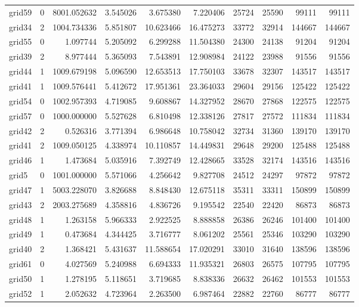 \begin{longtable}{|l|r|r|r|r|r|r|r|r|r|}
grid59 & 0 & 8001.052632 & 3.545026 & 3.675380 & 7.220406 & 25724 & 25590 & 99111 & 99111 \\
grid34 & 2 & 1004.734336 & 5.851807 & 10.623466 & 16.475273 & 33772 & 32914 & 144667 & 144667 \\
grid55 & 0 & 1.097744 & 5.205092 & 6.299288 & 11.504380 & 24300 & 24138 & 91204 & 91204 \\
grid39 & 2 & 8.977444 & 5.365093 & 7.543891 & 12.908984 & 24122 & 23988 & 91556 & 91556 \\
grid44 & 1 & 1009.679198 & 5.096590 & 12.653513 & 17.750103 & 33678 & 32307 & 143517 & 143517 \\
grid41 & 1 & 1009.576441 & 5.412672 & 17.951361 & 23.364033 & 29604 & 29156 & 125422 & 125422 \\
grid54 & 0 & 1002.957393 & 4.719085 & 9.608867 & 14.327952 & 28670 & 27868 & 122575 & 122575 \\
grid57 & 0 & 1000.000000 & 5.527628 & 6.810498 & 12.338126 & 27817 & 27572 & 111834 & 111834 \\
grid42 & 2 & 0.526316 & 3.771394 & 6.986648 & 10.758042 & 32734 & 31360 & 139170 & 139170 \\
grid41 & 2 & 1009.050125 & 4.338974 & 10.110857 & 14.449831 & 29648 & 29200 & 125488 & 125488 \\
grid46 & 1 & 1.473684 & 5.035916 & 7.392749 & 12.428665 & 33528 & 32174 & 143516 & 143516 \\
grid5 & 0 & 1001.000000 & 5.571066 & 4.256642 & 9.827708 & 24512 & 24297 & 97872 & 97872 \\
grid47 & 1 & 5003.228070 & 3.826688 & 8.848430 & 12.675118 & 35311 & 33311 & 150899 & 150899 \\
grid43 & 2 & 2003.275689 & 4.358816 & 4.836726 & 9.195542 & 22540 & 22420 & 86873 & 86873 \\
grid48 & 1 & 1.263158 & 5.966333 & 2.922525 & 8.888858 & 26386 & 26246 & 101400 & 101400 \\
grid49 & 1 & 0.473684 & 4.344425 & 3.716777 & 8.061202 & 25561 & 25346 & 103290 & 103290 \\
grid40 & 2 & 1.368421 & 5.431637 & 11.588654 & 17.020291 & 33010 & 31640 & 138596 & 138596 \\
grid61 & 0 & 4.027569 & 5.240988 & 6.694333 & 11.935321 & 26803 & 26575 & 107795 & 107795 \\
grid50 & 1 & 1.278195 & 5.118651 & 3.719685 & 8.838336 & 26632 & 26462 & 101553 & 101553 \\
grid52 & 1 & 2.052632 & 4.723964 & 2.263500 & 6.987464 & 22882 & 22760 & 86777 & 86777 \\

\end{longtable}
